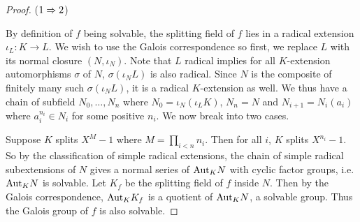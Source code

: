 \documentclass[../book.tex]{subfiles}
\begin{document}
\begin{proof}
    
    ($1\Rightarrow 2$) 
    
    By definition of $f$ being solvable, 
    the splitting field of $f$ lies in a radical extension $\iota_L : K \to L$.
    We wish to use the Galois correspondence 
    so first, we replace $L$ with its normal closure $(N,\iota_N)$.
    Note that $L$ radical implies 
    for all $K$-extension automorphisms $\sigma$ of $N$,
    $\sigma(\iota_N L)$ is also radical. 
    Since $N$ is the composite of finitely many such $\sigma(\iota_N L)$,
    it is a radical $K$-extension as well.
    We thus have a chain of subfield $N_0,\dots,N_n$ 
    where $N_0 = \iota_N(\iota_L K)$, $N_n = N$ and
    $N_{i+1} = N_i(a_i)$ where $a_i^{n_i} \in N_i$ for some positive $n_i$. 
    We now break into two cases.
    
    Suppose $K$ splits $X^{M} - 1$ where $M = \prod_{i<n} n_i$. 
    Then for all $i$, $K$ splits $X^{n_i} - 1$.
    So by the classification of simple radical extensions,
    the chain of simple radical subextensions of $N$ gives 
    a normal series of $\mathrm{Aut}_{K}N$ with cyclic factor groups,
    i.e. $\mathrm{Aut}_{K}N$ is solvable. 
    Let $K_f$ be the splitting field of $f$ inside $N$.
    Then by the Galois correspondence, 
    $\mathrm{Aut}_{K}K_f$ is a quotient of $\mathrm{Aut}_{K}N$, a solvable group.
    Thus the Galois group of $f$ is also solvable. 
    

\end{proof}
\end{document}
